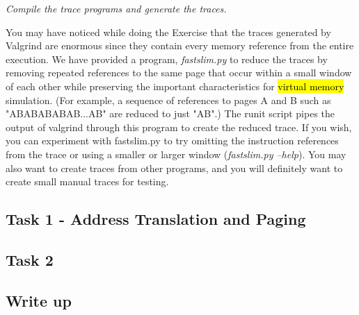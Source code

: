\documentclass[12pt]{article}
\begin{document}
\bigskip

\noindent \textit{Compile the trace programs and generate the traces.}

\bigskip

\noindent You may have noticed while doing the Exercise that the traces generated
by Valgrind are enormous since they contain every memory reference from the entire
execution. We have provided a program, \textit{fastslim.py} to reduce the traces by removing
repeated references to the same page that occur within a small window of each other
while preserving the important characteristics for \hl{virtual memory} simulation.
(For example, a sequence of references to pages A and B such as "ABABABABAB...AB"
are reduced to just "AB".) The runit script pipes the output of valgrind through
this program to create the reduced trace. If you wish, you can experiment with
fastslim.py to try omitting the instruction references from the trace or using a
smaller or larger window (\textit{fastslim.py --help}). You may also want to create traces
from other programs, and you will definitely want to create small manual traces
for testing.

\subsection{Task 1 - Address Translation and Paging}

\bigskip

\subsection{Task 2}

\bigskip

\subsection{Write up}
\end{document}

